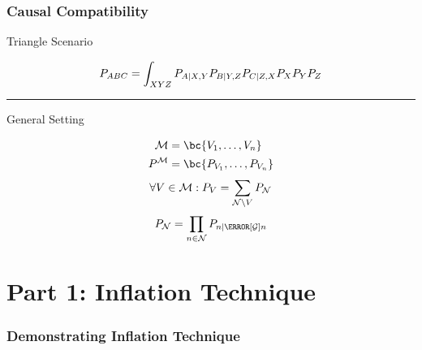 \documentclass[
    hyperref={bookmarks=false},%
    xcolor={dvipsnames},
]{beamer}
\begin{document}
\begin{frame}
    \frametitle{Causal Compatibility}
    \vfill
    \begin{center}
        Triangle Scenario
    \end{center}
    \[ \prob[ABC] = \int_{XYZ}\prob[A|X,Y]\prob[B|Y,Z]\prob[C|Z,X]\prob[X]\prob[Y]\prob[Z] \]
    \vfill
    \begin{center}
        \noindent\rule{8cm}{0.4pt}
    \end{center}
    \vfill
    \begin{center}
        General Setting
    \end{center}
    \begin{align*}
    \mscenario &= \bc{V_1, \ldots, V_n} \\
    \prob^{\mscenario} &= \bc{\prob[V_1], \ldots, \prob[V_n]}
    \end{align*}
    \[ \forall V \in \mscenario: \prob[V] = \sum_{\nodes \setminus V} \prob[\nodes] \]
    \[ \prob[\nodes] = \prod_{n\in\nodes}\prob[n \mid \Pa[\graph]{n}] \]
    \vfill
\end{frame}

\section{Part 1: Inflation Technique}
\begin{frame}
    \frametitle{Demonstrating Inflation Technique}
    \vfill
    \begin{center}
    \begin{columns}
        \scalebox{1.0}{}
        \scalebox{1.0}{}
    \end{columns}
    \end{center}
\end{frame}
\end{document}
